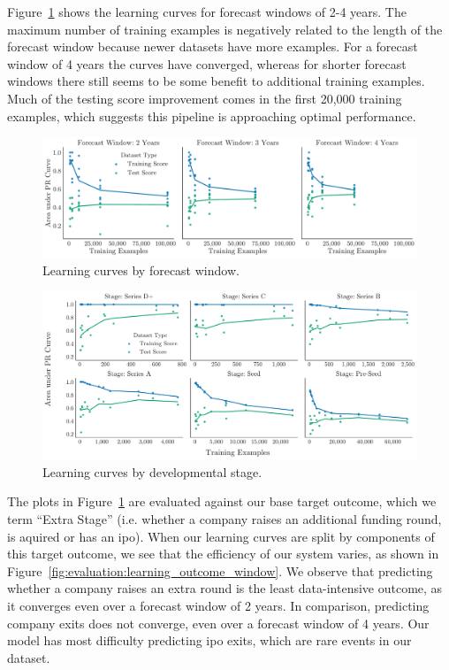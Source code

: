 \documentclass[../thesis/thesis.tex]{subfiles}
\begin{document}
Figure~\ref{fig:evaluation:learning_window} shows the learning curves for forecast windows of 2-4 years. The maximum number of training examples is negatively related to the length of the forecast window because newer datasets have more examples. For a forecast window of 4 years the curves have converged, whereas for shorter forecast windows there still seems to be some benefit to additional training examples. Much of the testing score improvement comes in the first 20,000 training examples, which suggests this pipeline is approaching optimal performance.

\begin{figure}[!htb]
    \centering
    \includegraphics[width=\textwidth]{../figures/evaluation/learning_curves_window}
    \caption[Learning curves by forecast window]{Learning curves by forecast window.}
    \label{fig:evaluation:learning_window}
\end{figure}


\begin{figure}[!htb]
    \centering
    \includegraphics[width=\textwidth]{../figures/evaluation/learning_curves_stage}
    \caption[Learning curves by developmental stage]{Learning curves by developmental stage.}
    \label{fig:evaluation:learning_stage}
\end{figure}

The plots in Figure~\ref{fig:evaluation:learning_window} are evaluated against our base target outcome, which we term ``Extra Stage'' (i.e. whether a company raises an additional funding round, is aquired or has an \gls{ipo}). When our learning curves are split by components of this target outcome, we see that the efficiency of our system varies, as shown in Figure~\ref{fig:evaluation:learning_outcome_window}. We observe that predicting whether a company raises an extra round is the least data-intensive outcome, as it converges even over a forecast window of 2 years. In comparison, predicting company exits does not converge, even over a forecast window of 4 years. Our model has most difficulty predicting \gls{ipo} exits, which are rare events in our dataset.
\end{document}

